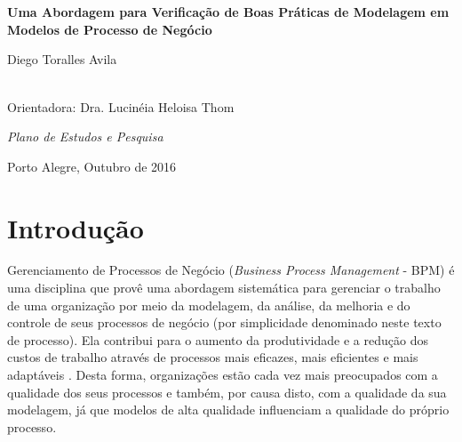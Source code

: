\documentclass[12pt]{article}
\begin{document}
	
\begin{titlepage}
	\thispagestyle{empty}
	
	\vfill 
	
	
	\begin{center}
		
		\\
		
		
		 \\
		
		\vspace*{2.5cm}
		
		
		\Large{{\bf Uma Abordagem para Verificação de Boas Práticas de Modelagem em Modelos de Processo de Negócio }}
		
		\vspace*{2cm}
		
		
		\Large{Diego Toralles Avila\\ }\\ 
		
		
		\vspace*{1cm}
		
		\normalsize{Orientadora: Dra. Lucinéia Heloisa Thom}
		
		\vspace*{1.5cm}
		\begin{flushright} 
			\parbox[l]{9.3cm}{
				
				\normalsize{\emph{Plano de Estudos e Pesquisa}}}
		\end{flushright}
		\vspace*{2cm}
		
		\large{Porto Alegre, Outubro de 2016}
	\end{center}
\end{titlepage}

\section{Introdução}

Gerenciamento de Processos de Negócio (\textit{Business Process Management} - BPM) é uma disciplina que provê uma abordagem sistemática para gerenciar o trabalho de uma organização por meio da modelagem, da análise, da melhoria e do controle de seus processos de negócio (por simplicidade denominado neste texto de processo). Ela contribui para o aumento da produtividade e a redução dos custos de trabalho através de processos mais eficazes, mais eficientes e mais adaptáveis \cite{aalst:2013}. Desta forma, organizações estão cada vez mais preocupados com a qualidade dos seus  processos e também, por causa disto, com a qualidade da sua modelagem,  já que modelos de alta qualidade influenciam a qualidade do próprio processo.
\end{document}
